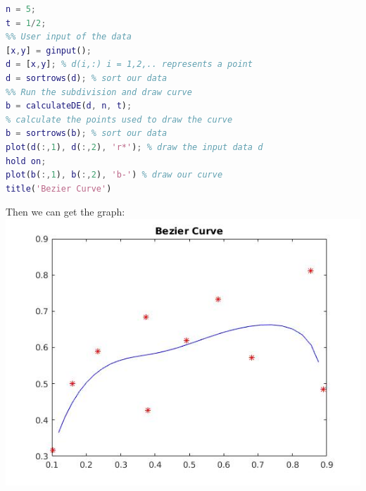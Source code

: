 \documentclass[12pt]{article}
\begin{document}
\begin{lstlisting}[language=Matlab]
n = 5; 
t = 1/2; 
%% User input of the data
[x,y] = ginput();  
d = [x,y]; % d(i,:) i = 1,2,.. represents a point 
d = sortrows(d); % sort our data 
%% Run the subdivision and draw curve
b = calculateDE(d, n, t); 
% calculate the points used to draw the curve 
b = sortrows(b); % sort our data 
plot(d(:,1), d(:,2), 'r*'); % draw the input data d
hold on;
plot(b(:,1), b(:,2), 'b-') % draw our curve 
title('Bezier Curve')
\end{lstlisting}
Then we can get the graph: \\
\includegraphics[scale=.5]{npoints}
\end{document}
